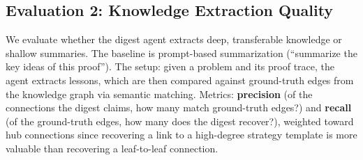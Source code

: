 \subsection{Evaluation 2: Knowledge Extraction Quality}

We evaluate whether the digest agent extracts deep, transferable knowledge or shallow summaries. The baseline is prompt-based summarization (``summarize the key ideas of this proof''). The setup: given a problem and its proof trace, the agent extracts lessons, which are then compared against ground-truth edges from the knowledge graph via semantic matching. Metrics: \textbf{precision} (of the connections the digest claims, how many match ground-truth edges?) and \textbf{recall} (of the ground-truth edges, how many does the digest recover?), weighted toward hub connections since recovering a link to a high-degree strategy template is more valuable than recovering a leaf-to-leaf connection.
